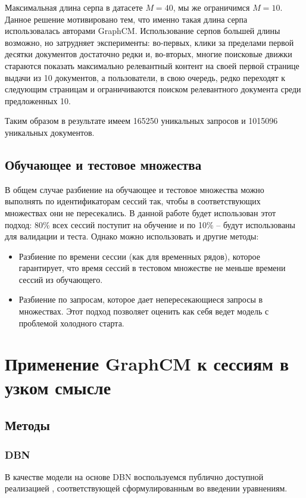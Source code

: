 \documentclass[diploma]{nanolab2015}
\begin{document}
Максимальная длина серпа в датасете $M = 40$, мы же ограничимся $M = 10$. Данное решение мотивировано тем, что именно такая длина серпа использовалась авторами GraphCM. Использование серпов большей длины возможно, но затрудняет эксперименты: во-первых, клики за пределами первой десятки документов достаточно редки и, во-вторых, многие поисковые движки стараются показать максимально релевантный контент на своей первой странице выдачи из 10 документов, а пользователи, в свою очередь, редко переходят к следующим страницам и ограничиваются поиском релевантного документа среди предложенных 10.

Таким образом в результате имеем 165250 уникальных запросов и 1015096 уникальных документов.

\subsection{Обучающее и тестовое множества}
В общем случае разбиение на обучающее и тестовое множества можно выполнять по идентификаторам сессий так, чтобы в соответствующих множествах они не пересекались. В данной работе будет использован этот подход: 80\% всех сессий поступит на обучение и по 10\% -- будут использованы для валидации и теста. Однако можно использовать и другие методы:
\begin{itemize}
    \item Разбиение по времени сессии (как для временных рядов), которое гарантирует, что время сессий в тестовом множестве не меньше времени сессий из обучающего.
    \item Разбиение по запросам, которое дает непересекающиеся запросы в множествах. Этот подход позволяет оценить как себя ведет модель с проблемой холодного старта.
\end{itemize}

\section{Применение GraphCM к сессиям в узком смысле}
\subsection{Методы}
\subsubsection{DBN}
В качестве модели на основе DBN воспользуемся публично доступной реализацией \cite{dbngithub}, соответствующей сформулированным во введении уравнениям.
\end{document}
